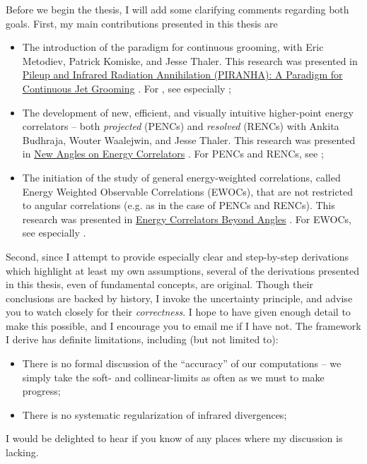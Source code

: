 Before we begin the thesis, I will add some clarifying comments regarding both goals.
%
First, my main contributions presented in this thesis are
\begin{itemize}
    \item
        The introduction of the \PIRANHA{} paradigm for continuous grooming, with Eric Metodiev, Patrick Komiske, and Jesse Thaler.
        This research was presented in \ul{Pileup and Infrared Radiation Annihilation (PIRANHA): A Paradigm for Continuous Jet Grooming} \cite{Alipour-Fard:2023prj}.
        For \PIRANHA{}, see especially ;

    \item
        The development of new, efficient, and visually intuitive higher-point energy correlators -- both \emph{projected} (PENCs) and \emph{resolved} (RENCs) with Ankita Budhraja, Wouter Waalejwin, and Jesse Thaler.
        This research was presented in \ul{New Angles on Energy Correlators} \cite{Alipour-fard:2024szj}.
        For PENCs and RENCs, see ;

    \item
        The initiation of the study of general energy-weighted correlations, called Energy Weighted Observable Correlations (EWOCs), that are not restricted to angular correlations (e.g. as in the case of PENCs and RENCs).
        This research was presented in \ul{Energy Correlators Beyond Angles} \cite{Alipour-fard:2025dvp}.
        For EWOCs, see especially .
\end{itemize}

Second, since I attempt to provide especially clear and step-by-step derivations which highlight at least my own assumptions, several of the derivations presented in this thesis, even of fundamental concepts, are original.
%
Though their conclusions are backed by history, I invoke the uncertainty principle, and advise you to watch closely for their \emph{correctness}.
%
I hope to have given enough detail to make this possible, and I encourage you to email me if I have not.
%
The framework I derive has definite limitations, including (but not limited to):
\begin{itemize}
    \item
        There is no formal discussion of the ``accuracy'' of our computations -- we simply take the soft- and collinear-limits as often as we must to make progress;

    \item
        There is no systematic regularization of infrared divergences;
\end{itemize}
I would be delighted to hear if you know of any places where my discussion is lacking.

